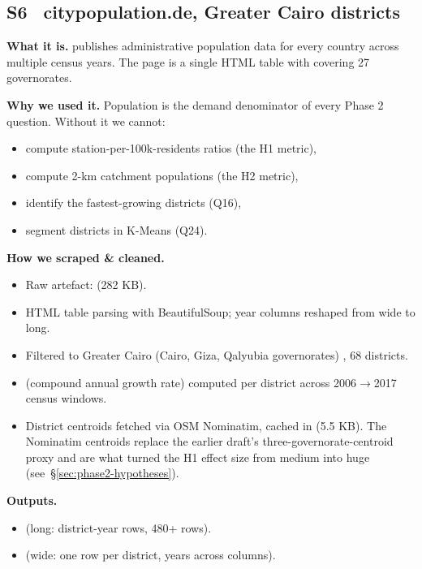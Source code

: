 \subsection{S6 \textbullet\ citypopulation.de, Greater Cairo districts}

\textbf{What it is.}  publishes administrative
population data for every country across multiple census years. The
 page is a single HTML table with 
covering 27 governorates.

\textbf{Why we used it.} Population is the demand denominator of every
Phase 2 question. Without it we cannot:
\begin{itemize}
 \item compute station-per-100k-residents ratios (the H1 metric),
 \item compute 2-km catchment populations (the H2 metric),
 \item identify the fastest-growing districts (Q16),
 \item segment districts in K-Means (Q24).
\end{itemize}

\textbf{How we scraped \& cleaned.}
\begin{itemize}
 \item Raw artefact:  (282 KB).
 \item HTML table parsing with BeautifulSoup; year columns reshaped
 from wide to long.
 \item Filtered to Greater Cairo (Cairo, Giza, Qalyubia governorates)
, 68 districts.
 \item {} (compound annual growth rate) computed per district
 across 2006$\to$2017 census windows.
 \item District centroids fetched via OSM Nominatim, cached in
  (5.5 KB). The Nominatim
 centroids replace the earlier draft's three-governorate-centroid
 proxy and are what turned the H1 effect size from medium into
 huge (see~\S\ref{sec:phase2-hypotheses}).
\end{itemize}

\textbf{Outputs.}
\begin{itemize}
 \item {} (long: district-year rows, 480+ rows).
 \item {} (wide: one row per district, years
 across columns).
\end{itemize}

